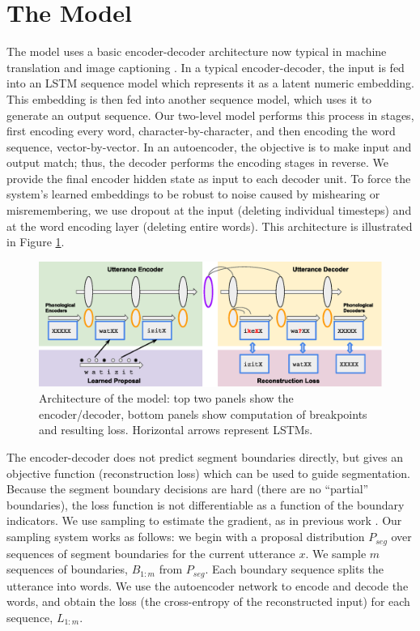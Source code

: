 \documentclass[11pt,letterpaper]{article}
\begin{document}
\section{The Model}

The model uses a basic encoder-decoder architecture now typical in
machine translation \cite{Cho14} and image captioning
\cite{Vinyals15}. In a typical encoder-decoder, the input is fed into
an LSTM sequence model \cite{Hochreiter97} which represents it as a
latent numeric embedding. This embedding is then fed into another
sequence model, which uses it to generate an output sequence. Our
two-level model performs this process in stages, first encoding every
word, character-by-character, and then encoding the word sequence,
vector-by-vector. In an autoencoder, the objective is to make input
and output match; thus, the decoder performs the encoding stages in
reverse. We provide the final encoder hidden state as input to each
decoder unit. To force the system's learned embeddings to be robust to
noise caused by mishearing or misremembering, we use dropout
\cite{Srivastava14} at the input (deleting individual timesteps) and
at the word encoding layer (deleting entire words). This architecture
is illustrated in Figure \ref{fig-arch}.

\begin{figure}
\includegraphics[width=\textwidth]{arch.eps}
\caption{Architecture of the model: top two panels show the
  encoder/decoder, bottom panels show computation of breakpoints and
  resulting loss. Horizontal arrows represent LSTMs.}
\label{fig-arch}
\end{figure}

The encoder-decoder does not predict segment boundaries directly, but
gives an objective function (reconstruction loss) which can be used to
guide segmentation. Because the segment boundary decisions are hard
(there are no ``partial'' boundaries), the loss function is not
differentiable as a function of the boundary indicators. We use
sampling to estimate the gradient, as in previous work
\cite{Mnih14,Xu15}. Our sampling system works as follows: we
begin with a proposal distribution $P_{seg}$ over sequences of segment
boundaries for the current utterance $x$. We sample $m$ sequences of
boundaries, $B_{1:m}$ from $P_{seg}$. Each boundary sequence splits
the utterance into words. We use the autoencoder network to encode and
decode the words, and obtain the loss (the cross-entropy of the
reconstructed input) for each sequence, $L_{1:m}$.
\end{document}
